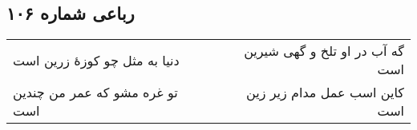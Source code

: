 \begin{center}
\section*{رباعی شماره ۱۰۶}
\label{sec:sh106}
\begin{longtable}{l p{0.5cm} r}
دنیا به مثل چو کوزهٔ زرین است
&&
گه آب در او تلخ و گهی شیرین است
\\
تو غره مشو که عمر من چندین است
&&
کاین اسب عمل مدام زیر زین است
\\
\end{longtable}
\end{center}
